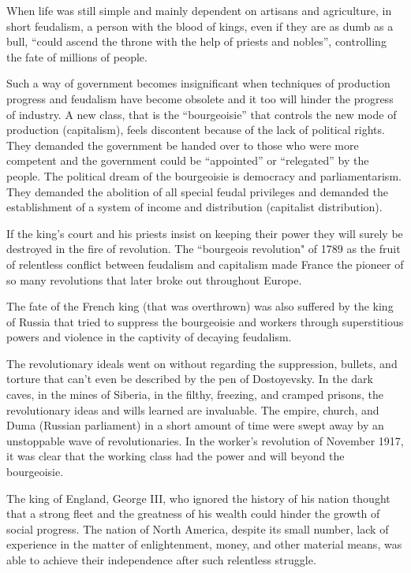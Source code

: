 When life was still simple and mainly dependent on artisans and agriculture, in short feudalism, a 
person with the blood of kings, even if they are as dumb as a bull, “could ascend the throne with the help of priests and nobles”, 
controlling the fate of millions of people.\nline

Such a way of government becomes insignificant when techniques of production progress and feudalism 
have become obsolete and it too will hinder the progress of industry. A new class, that is the “bourgeoisie” 
that controls the new mode of production (capitalism), feels discontent because of the lack of political rights. 
They demanded the government be handed over to those who were more competent and the government could be “appointed” or 
“relegated” by the people. The political dream of the bourgeoisie is democracy and parliamentarism. They demanded the abolition 
of all special feudal privileges and demanded the establishment of a system of income and distribution (capitalist distribution).\nline

If the king's court and his priests insist on keeping their power they will surely be destroyed in the 
fire of revolution. The “bourgeois revolution" of 1789 as the fruit of relentless conflict between feudalism 
and capitalism made France the pioneer of so many revolutions that later broke out throughout Europe.\nline

The fate of the French king (that was overthrown) was also suffered by the king of Russia that tried to 
suppress the bourgeoisie and workers through superstitious powers and violence in the captivity of decaying feudalism.\nline

The revolutionary ideals went on without regarding the suppression, bullets, and torture that can't even be described 
by the pen of Dostoyevsky. In the dark caves, in the mines of Siberia, in the filthy, freezing, and cramped prisons, 
the revolutionary ideas and wills learned are invaluable. The empire, church, and Duma (Russian parliament) in a short 
amount of time were swept away by an unstoppable wave of revolutionaries. In the worker's revolution of November 1917, 
it was clear that the working class had the power and will beyond the bourgeoisie.\nline

The king of England, George III, who ignored the history of his nation thought that a strong fleet 
and the greatness of his wealth could hinder the growth of social progress. The nation of North America, 
despite its small number, lack of experience in the matter of enlightenment, money, and other material means, 
was able to achieve their independence after such relentless struggle.\nline

